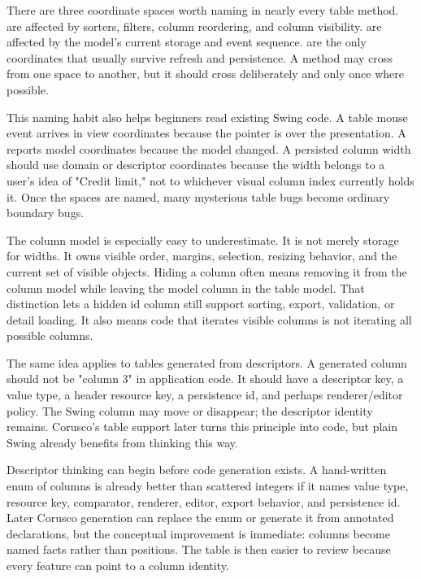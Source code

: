 There are three coordinate spaces worth naming in nearly every table method.  are affected by sorters, filters, column reordering, and column visibility.  are affected by the model's current storage and event sequence.  are the only coordinates that usually survive refresh and persistence. A method may cross from one space to another, but it should cross deliberately and only once where possible.

This naming habit also helps beginners read existing Swing code. A table mouse event arrives in view coordinates because the pointer is over the presentation. A  reports model coordinates because the model changed. A persisted column width should use domain or descriptor coordinates because the width belongs to a user's idea of "Credit limit," not to whichever visual column index currently holds it. Once the spaces are named, many mysterious table bugs become ordinary boundary bugs.

The column model is especially easy to underestimate. It is not merely storage for widths. It owns visible order, margins, selection, resizing behavior, and the current set of visible  objects. Hiding a column often means removing it from the column model while leaving the model column in the table model. That distinction lets a hidden id column still support sorting, export, validation, or detail loading. It also means code that iterates visible columns is not iterating all possible columns.

The same idea applies to tables generated from descriptors. A generated column should not be "column 3" in application code. It should have a descriptor key, a value type, a header resource key, a persistence id, and perhaps renderer/editor policy. The Swing column may move or disappear; the descriptor identity remains. Corusco's table support later turns this principle into code, but plain Swing already benefits from thinking this way.

Descriptor thinking can begin before code generation exists. A hand-written enum of columns is already better than scattered integers if it names value type, resource key, comparator, renderer, editor, export behavior, and persistence id. Later Corusco generation can replace the enum or generate it from annotated declarations, but the conceptual improvement is immediate: columns become named facts rather than positions. The table is then easier to review because every feature can point to a column identity.

